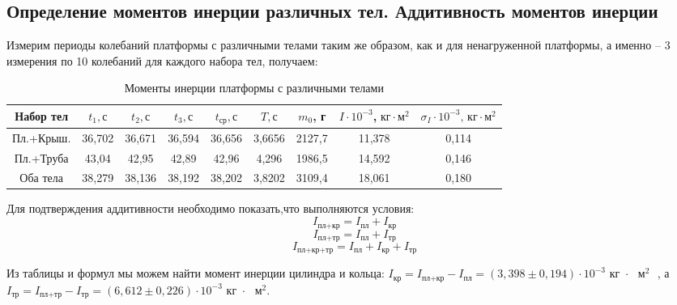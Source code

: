 \documentclass[a4paper,12pt]{article}
\begin{document}
\subsection*{Определение моментов инерции различных тел. Аддитивность моментов инерции}
    Измерим периоды колебаний платформы с различными телами таким же образом, как и для ненагруженной платформы, а именно -- 3 измерения по 10 колебаний для каждого набора тел, получаем:
	\begin{table}[H]
        \begin{center}
            \begin{tabular}{|c|c|c|c|c|c|c|c|c|}
                \hline 
                Набор тел & $t_1, с$ & $t_2, с$ & $t_3, с$ & $t_\text{ср}, с$ & $T, с$ & $m_0$, г & $I \cdot 10^{-3}$,$\text{ кг} \cdot \text{м}^2$ & $\sigma_I \cdot 10^{-3}\text{, кг} \cdot \text{м}^2$\\
                \hline
                Пл.+Крыш. & 36,702 & 36,671 & 36,594 &  36,656  & 3,6656 & 2127,7 & 11,378 & 0,114\\
                \hline 
                Пл.+Труба & 43,04 & 42,95 & 42,89 & 42,96 & 4,296 & 1986,5 & 14,592 & 0,146\\
                \hline 
                Оба тела & 38,279 & 38,136 & 38,192 & 38,202 & 3,8202 & 3109,4 & 18,061 & 0,180\\
                \hline 
            \end{tabular}
            \caption{Моменты инерции платформы с различными телами}
        \end{center}
    \end{table} 

    Для подтверждения аддитивности необходимо показать,что выполняются условия:
    $$I_\text{пл+кр} = I_\text{пл} + I_\text{кр}$$
    $$I_\text{пл+тр} = I_\text{пл} + I_\text{тр}$$
    $$I_\text{пл+кр+тр} = I_\text{пл} + I_\text{кр} + I_\text{тр}$$

    Из таблицы и формул мы можем найти момент инерции цилиндра и кольца: $I_\text{кр} = I_\text{пл+кр} - I_\text{пл} = \left(3,398 \pm 0,194\right) \cdot 10^{-3} \text{ кг $\cdot$ $\text{м}^2$ }$, а $I_\text{тр} = I_\text{пл+тр} - I_\text{тр} = \left(6,612 \pm 0,226\right) \cdot 10^{-3} \text{ кг $\cdot$ $\text{м}^2$}$.
     
\end{document}

